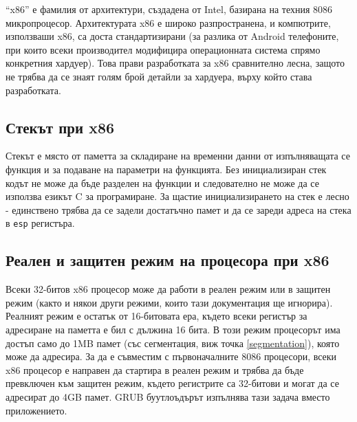   ``x86'' е фамилия от архитектури, създадена от Intel, базирана на техния 8086 микропроцесор.\cite[глава~2.1]{intel-manual-1} Архитектурата x86 е широко разпространена, и компютрите, използваши x86, са доста стандартизирани (за разлика от Android телефоните, при които всеки производител модифицира операционната система спрямо конкретния хардуер). %
  Това прави разработката за x86 сравнително лесна, защото не трябва да се знаят голям брой детайли за хардуера, върху който става разработката.


  \subsection{Стекът при x86}
  Стекът е място от паметта за складиране на временни данни от изпълняващата се функция и за подаване на параметри на функцията. Без инициализиран стек кодът не може да бъде разделен на функции и следователно не може да се използва езикът C за програмиране. За щастие инициализирането на стек е лесно - единствено трябва да се задели достатъчно памет и да се зареди адреса на стека в {\tt esp} регистъра.

  \subsection{Реален и защитен режим на процесора при x86} \label{processormodes}
  Всеки 32-битов x86 процесор може да работи в реален режим или в защитен режим\cite{intel-manual-1} (както и някои други режими, които тази документация ще игнорира). Реалният режим е остатък от 16-битовата ера, където всеки регистър за адресиране на паметта е бил с дължина 16 бита. В този режим процесорът има достъп само до 1MB памет (със сегментация, виж точка \ref{segmentation}), която може да адресира. За да е съвместим с първоначалните 8086 процесори, всеки x86 процесор е направен да стартира в реален режим и трябва да бъде превключен към защитен режим, където регистрите са 32-битови и могат да се адресират до 4GB памет. GRUB буутлоъдърът изпълнява тази задача вместо приложението.

